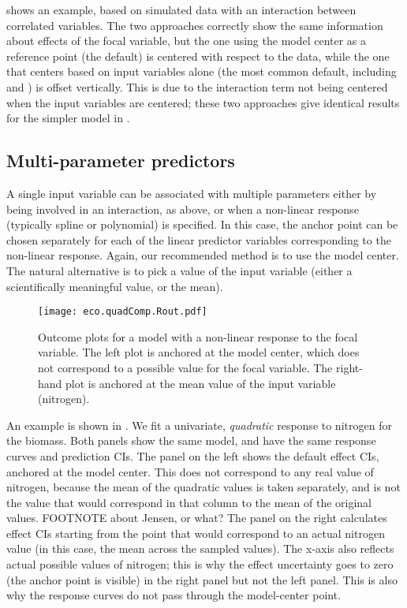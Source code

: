  shows an example, based on simulated data with an interaction between correlated variables. The two approaches correctly show the same information about effects of the focal variable, but the one using the model center as a reference point (the  default) is centered with respect to the data, while the one that centers based on input variables alone (the most common default, including  and ) is offset vertically. This is due to the interaction term not being centered when the input variables are centered; these two approaches give identical results for the simpler model in .

\subsection{Multi-parameter predictors}

A single input variable can be associated with multiple parameters either by being involved in an interaction, as above, or when a non-linear response (typically spline or polynomial) is specified. In this case, the anchor point can be chosen separately for each of the linear predictor variables corresponding to the non-linear response. Again, our recommended method is to use the model center. The natural alternative is to pick a value of the input variable (either a scientifically meaningful value, or the mean).

\begin{figure}
\begin{center}
\texttt{[image: eco.quadComp.Rout.pdf]}
\end{center}
\caption{Outcome plots for a model with a non-linear response to the focal variable. The left plot is anchored at the model center, which does not correspond to a possible value for the focal variable. The right-hand plot is anchored at the mean value of the input variable (nitrogen). }
\end{figure}

An example is shown in . We fit a univariate, \emph{quadratic} response to nitrogen for the biomass. Both panels show the same model, and have the same response curves and prediction CIs. The panel on the left shows the default effect CIs, anchored at the model center. This does not correspond to any real value of nitrogen, because the mean of the quadratic values is taken separately, and is not the value that would correspond in that column to the mean of the original values. FOOTNOTE about Jensen, or what?  The panel on the right calculates effect CIs starting from the point that would correspond to an actual nitrogen value (in this case, the mean across the sampled values). The x-axis also reflects actual possible values of nitrogen; this is why the effect uncertainty goes to zero (the anchor point is visible) in the right panel but not the left panel. This is also why the response curves do not pass through the model-center point. 
